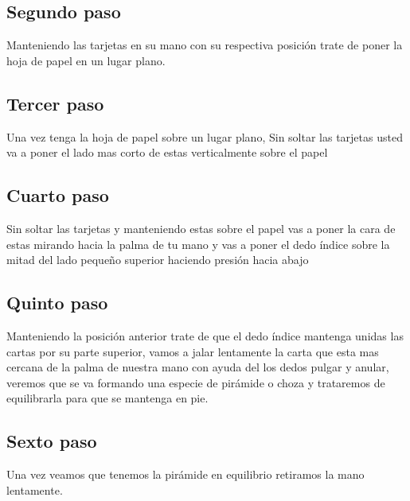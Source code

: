 \documentclass{article}
\begin{document}
\subsection{Segundo paso} \label{contenido}
Manteniendo las tarjetas en su mano con su respectiva posición trate de poner la hoja de papel en un lugar plano.
\subsection{Tercer paso} \label{contenido}
Una vez tenga la hoja de papel sobre un lugar plano, Sin soltar las tarjetas usted va a poner el lado mas corto de estas verticalmente sobre el papel
\subsection{Cuarto paso} \label{contenido}
Sin soltar las tarjetas y manteniendo estas sobre el papel vas a poner la cara de estas mirando hacia la palma de tu mano y vas a poner el dedo índice sobre la mitad del lado pequeño superior haciendo presión hacia abajo
\subsection{Quinto paso} \label{contenido}
Manteniendo la posición anterior trate de que el dedo índice mantenga unidas las cartas por su parte superior, vamos a jalar lentamente la carta que esta mas cercana de la palma de nuestra mano con ayuda del los dedos pulgar y anular, veremos que se va formando una especie de pirámide o choza y trataremos de equilibrarla para que se mantenga en pie.
\subsection{Sexto paso} \label{contenido}
Una vez veamos que tenemos la pirámide en equilibrio retiramos la mano lentamente.
\end{document}
